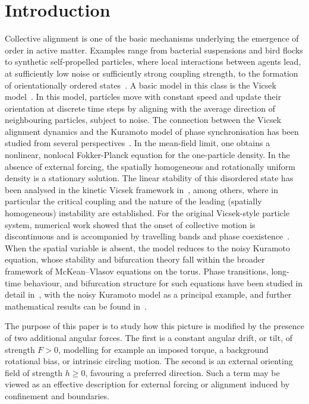 \documentclass[a4paper,11pt]{article}
\theoremstyle{plain}
\theoremstyle{definition}
\theoremstyle{remark}
\begin{document}
\section{Introduction}\label{sec:introduction} 
Collective alignment is one of the basic mechanisms underlying the emergence of order in active matter. Examples range from bacterial suspensions and bird flocks to synthetic self-propelled particles, where local interactions between agents lead, at sufficiently low noise or sufficiently strong coupling strength, to the formation of orientationally ordered states~\cite{vicsek2012collective, marchetti2013hydrodynamics, ramaswamy2010mechanics, peruani2012collective, peruani2008mean, bechinger2016active}.
A basic model in this class is the Vicsek model~\cite{vicsek1995novel}. In this model, particles move with constant speed and update their orientation at discrete time steps by aligning with the average direction of neighbouring particles, subject to noise. The connection between the Vicsek alignment dynamics and the Kuramoto model of phase synchronisation has been studied from several perspectives~\cite{chepizhko2010relation, degond2014hydrodynamics}. In the mean-field limit, one obtains a nonlinear, nonlocal Fokker-Planck equation for the one-particle density. In the absence of external forcing, the spatially homogeneous and rotationally uniform density is a stationary solution. The linear stability of this disordered state has been analysed in the kinetic Vicsek framework in~\cite{peruani2008mean, degond2008continuum, degond2015phase}, among others, where in particular the critical coupling and the nature of the leading (spatially homogeneous) instability are established. For the original Vicsek-style particle system, numerical work showed that the onset of collective motion is discontinuous and is accompanied by travelling bands and phase coexistence~\cite{gregoire2004onset,chate2008collective}. When the spatial variable is absent, the model reduces to the noisy Kuramoto equation, whose stability and bifurcation theory fall within the broader framework of McKean–Vlasov equations on the torus. Phase transitions, long-time behaviour, and bifurcation structure for such equations have been studied in detail in~\cite{carrillo2020long}, with the noisy Kuramoto model as a principal example, and further mathematical results can be found in~\cite{dawson1983critical, delgadino2020diffusive}. 

The purpose of this paper is to study how this picture is modified by the presence of two additional angular forces. The first is a constant angular drift, or tilt, of strength $F>0$, modelling for example an imposed torque, a background rotational bias, or intrinsic circling motion. The second is an external orienting field of strength $h\geq 0$, favouring a preferred direction. Such a term may be viewed as an effective description for external forcing or alignment induced by confinement and boundaries.
\end{document}
